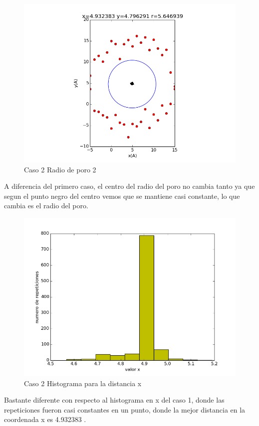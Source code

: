 \documentclass{article}
\begin{document}
\newpage
\begin{figure}[h!]
  \includegraphics[scale=0.5]{radio_de_poro1.png}
  \caption{Caso 2 Radio de poro 2  }
\end{figure}
A diferencia del primero caso, el centro del radio del poro no cambia tanto ya que segun el punto negro del centro vemos que se mantiene casi constante, lo que cambia es  el radio del poro. \\

\newpage
\begin{figure}[h!]
  \includegraphics[scale=0.5]{histrogramax1.png}
  \caption{Caso 2 Histograma para la distancia x  }
\end{figure}
Bastante diferente con respecto al histograma en x del caso 1, donde las repeticiones fueron casi constantes en un punto, donde la mejor distancia en la coordenada x es 4.932383 .\\
\end{document}
